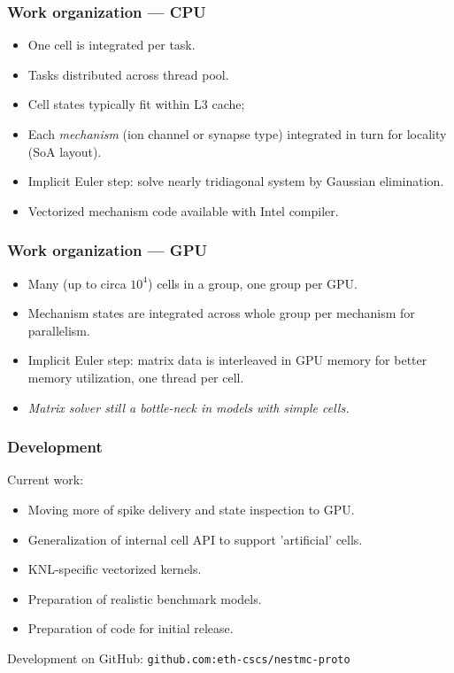 \documentclass[aspectratio=43,12pt]{beamer}
\begin{document}
\begin{frame}
\frametitle{Work organization --- CPU}

\begin{itemize}
\item One cell is integrated per task.
\item Tasks distributed across thread pool.
\item Cell states typically fit within L3 cache; 
\item Each \emph{mechanism} (ion channel or synapse type) integrated in turn for locality (SoA layout).
\item Implicit Euler step: solve nearly tridiagonal system by Gaussian elimination.
\item Vectorized mechanism code available with Intel compiler.
\end{itemize}
\vfill
\end{frame}

\begin{frame}
\frametitle{Work organization --- GPU}

\begin{itemize}
\item Many (up to circa $10^4$) cells in a group, one group per GPU.
\item Mechanism states are integrated across whole group per mechanism for parallelism.
\item Implicit Euler step: matrix data is interleaved in GPU memory for better memory utilization,
one thread per cell.
\item \emph{Matrix solver still a bottle-neck in models with simple cells.}
\end{itemize}
\vfill
\end{frame}

\begin{frame}
\frametitle{Development}
Current work:
\begin{itemize}
\item Moving more of spike delivery and state inspection to GPU.
\item Generalization of internal cell API to support 'artificial' cells.
\item KNL-specific vectorized kernels.
\item Preparation of realistic benchmark models.
\item Preparation of code for initial release.
\end{itemize}
\vfill
Development on GitHub: \texttt{github.com:eth-cscs/nestmc-proto}
\end{frame}
%
\end{document}
